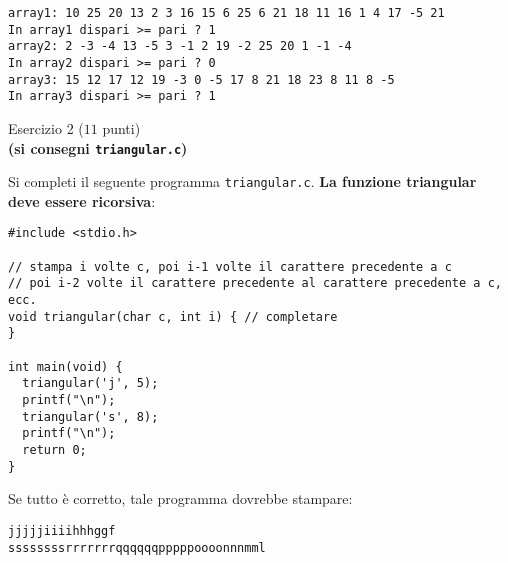 \documentclass[12pt]{article}
\begin{document}
\begin{mdframed}[backgroundcolor=lightgrey] 
\begin{verbatim}
array1: 10 25 20 13 2 3 16 15 6 25 6 21 18 11 16 1 4 17 -5 21 
In array1 dispari >= pari ? 1
array2: 2 -3 -4 13 -5 3 -1 2 19 -2 25 20 1 -1 -4 
In array2 dispari >= pari ? 0
array3: 15 12 17 12 19 -3 0 -5 17 8 21 18 23 8 11 8 -5 
In array3 dispari >= pari ? 1
\end{verbatim}
\end{mdframed}

\begin{center}
  {\Large Esercizio 2} ($11$ punti)\\
  \textbf{(si consegni \texttt{triangular.c})}
\end{center}
%
Si completi il seguente programma \texttt{triangular.c}.
\textbf{La funzione triangular deve essere ricorsiva}:

\begin{center}
  \begin{lstlisting}[language=myC]
#include <stdio.h>

// stampa i volte c, poi i-1 volte il carattere precedente a c
// poi i-2 volte il carattere precedente al carattere precedente a c, ecc.
void triangular(char c, int i) { // completare
}

int main(void) {
  triangular('j', 5);
  printf("\n");
  triangular('s', 8);
  printf("\n");
  return 0;
}
  \end{lstlisting}
\end{center}

Se tutto \`e corretto, tale programma dovrebbe stampare:

\begin{mdframed}[backgroundcolor=lightgrey] 
\begin{verbatim}
jjjjjiiiihhhggf
ssssssssrrrrrrrqqqqqqpppppoooonnnmml
\end{verbatim}
\end{mdframed}
\end{document}
